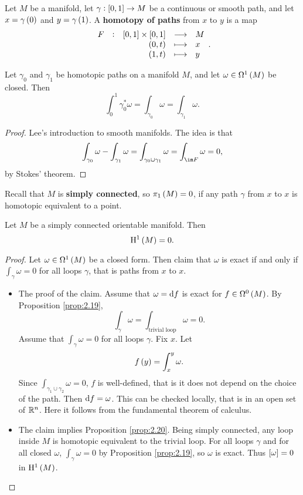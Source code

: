 \begin{definition}
Let $ M $ be a manifold, let $ \gamma : \sbr{0, 1} \to M $ be a continuous or smooth path, and let $ x = \gamma\br{0} $ and $ y = \gamma\br{1} $. A \textbf{homotopy of paths} from $ x $ to $ y $ is a map
$$ \functions[F]{\sbr{0, 1} \times \sbr{0, 1}}{M}{\br{0, t}}{x}{\br{1, t}}{y}. $$
\end{definition}

\begin{proposition}
\label{prop:2.19}
Let $ \gamma_0 $ and $ \gamma_1 $ be homotopic paths on a manifold $ M $, and let $ \omega \in \Omega^1\br{M} $ be closed. Then
$$ \int_0^1 \gamma_0^*\omega = \int_{\gamma_0} \omega = \int_{\gamma_1} \omega. $$
\end{proposition}

\begin{proof}
Lee's introduction to smooth manifolds. The idea is that
$$ \int_{\gamma_0} \omega - \int_{\gamma_1} \omega = \int_{\gamma_0 \cup \gamma_1} \omega = \int_{\im F} \omega = 0, $$
by Stokes' theorem.
\end{proof}

Recall that $ M $ is \textbf{simply connected}, so $ \pi_1\br{M} = 0 $, if any path $ \gamma $ from $ x $ to $ x $ is homotopic equivalent to a point.

\begin{proposition}
\label{prop:2.20}
Let $ M $ be a simply connected orientable manifold. Then
$$ \H^1\br{M} = 0. $$
\end{proposition}

\begin{proof}
Let $ \omega \in \Omega^1\br{M} $ be a closed form. Then claim that $ \omega $ is exact if and only if $ \int_\gamma \omega = 0 $ for all loops $ \gamma $, that is paths from $ x $ to $ x $.
\begin{itemize}
\item The proof of the claim. Assume that $ \omega = \mathrm{d} f $ is exact for $ f \in \Omega^0\br{M} $. By Proposition \ref{prop:2.19},
$$ \int_\gamma \omega = \int_{\text{trivial loop}} \omega = 0. $$
Assume that $ \int_\gamma \omega = 0 $ for all loops $ \gamma $. Fix $ x $. Let
$$ f\br{y} = \int_x^y \omega. $$
Since $ \int_{\gamma_1 \cup \gamma_2} \omega = 0 $, $ f $ is well-defined, that is it does not depend on the choice of the path. Then $ \mathrm{d} f = \omega $. This can be checked locally, that is in an open set of $ \mathbb{R}^n $. Here it follows from the fundamental theorem of calculus.
\item The claim implies Proposition \ref{prop:2.20}. Being simply connected, any loop inside $ M $ is homotopic equivalent to the trivial loop. For all loops $ \gamma $ and for all closed $ \omega $, $ \int_\gamma \omega = 0 $ by Proposition \ref{prop:2.19}, so $ \omega $ is exact. Thus $ \sbr{\omega} = 0 $ in $ \H^1\br{M} $.
\end{itemize}
\end{proof}

